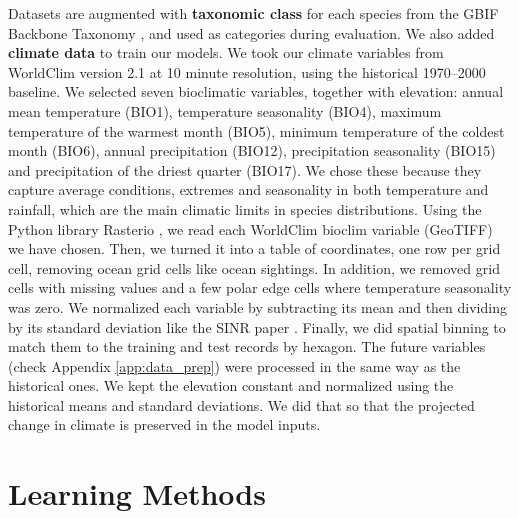 \documentclass{article}
\begin{document}
Datasets are augmented with \textbf{taxonomic class} for each species from the GBIF Backbone Taxonomy \cite{gbifbackbone}, and used as categories during evaluation. We also added \textbf{climate data} to train our models. We took our climate variables from WorldClim version 2.1 \cite{fick2017worldclim} at 10 minute resolution, using the historical 1970–2000 baseline. We selected seven bioclimatic variables, together with elevation: annual mean temperature (BIO1), temperature seasonality (BIO4), maximum temperature of the warmest month (BIO5), minimum temperature of the coldest month (BIO6), annual precipitation (BIO12), precipitation seasonality (BIO15) and precipitation of the driest quarter (BIO17). We chose these because they capture average conditions, extremes and seasonality in both temperature and rainfall, which are the main climatic limits in species distributions. Using the Python library Rasterio \cite{gillies_2019}, we read each WorldClim bioclim variable (GeoTIFF) we have chosen. Then, we turned it into a table of coordinates, one row per grid cell, removing ocean grid cells like ocean sightings. In addition, we removed grid cells with missing values and a few polar edge cells where temperature seasonality was zero. We normalized each variable by subtracting its mean  and then dividing by its standard deviation like the SINR paper \cite{cole2023sinr}. Finally, we did spatial binning to match them to the training and test records by hexagon. The future variables (check Appendix \ref{app:data_prep}) were processed in the same way as the historical ones. We kept the elevation constant and normalized using the historical means and standard deviations. We did that so that the projected change in climate is preserved in the model inputs.

\section{Learning Methods}\label{learn_meth}
\end{document}
